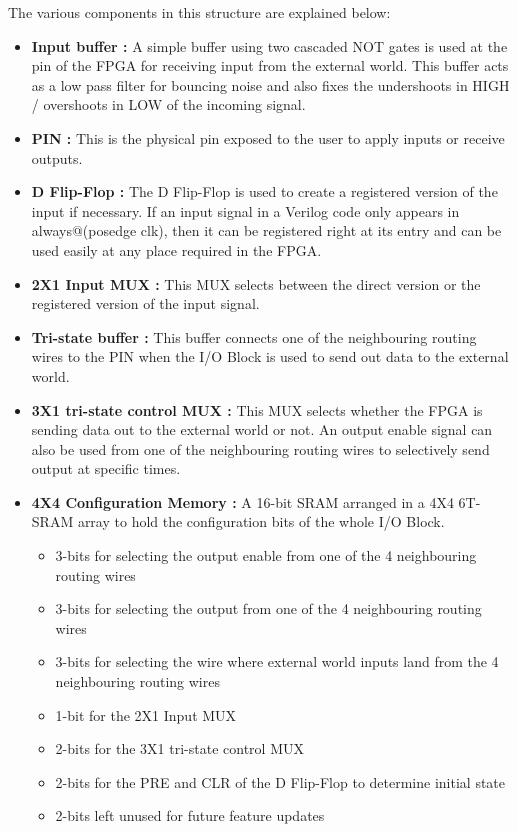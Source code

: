 The various components in this structure are explained below:
\begin{itemize}
\item \textbf{Input buffer : } A simple buffer using two cascaded NOT gates is used at the pin of the FPGA for receiving input from the external world. This buffer acts as a low pass filter for bouncing noise and also fixes the undershoots in HIGH / overshoots in LOW of the incoming signal.
\item \textbf{PIN :} This is the physical pin exposed to the user to apply inputs or receive outputs.
\item \textbf{D Flip-Flop :} The D Flip-Flop is used to create a registered version of the input if necessary. If an input signal in a Verilog code only appears in always@(posedge clk), then it can be registered right at its entry and can be used easily at any place required in the FPGA.
\item \textbf{2X1 Input MUX :} This MUX selects between the direct version or the registered version of the input signal.
\item \textbf{Tri-state buffer :} This buffer connects one of the neighbouring routing wires to the PIN when the I/O Block is used to send out data to the external world.
\item \textbf{3X1 tri-state control MUX :} This MUX selects whether the FPGA is sending data out to the external world or not. An output enable signal can also be used from one of the neighbouring routing wires to selectively send output at specific times.
\item \textbf{4X4 Configuration Memory :} A 16-bit SRAM arranged in a 4X4 6T-SRAM array to hold the configuration bits of the whole I/O Block. 
\begin{itemize}
\item 3-bits for selecting the output enable from one of the 4 neighbouring routing wires
\item 3-bits for selecting the output from one of the 4 neighbouring routing wires
\item 3-bits for selecting the wire where external world inputs land from the 4 neighbouring routing wires
\item 1-bit for the 2X1 Input MUX
\item 2-bits for the 3X1 tri-state control MUX
\item 2-bits for the PRE and CLR of the D Flip-Flop to determine initial state
\item 2-bits left unused for future feature updates
\end{itemize}
\end{itemize}


